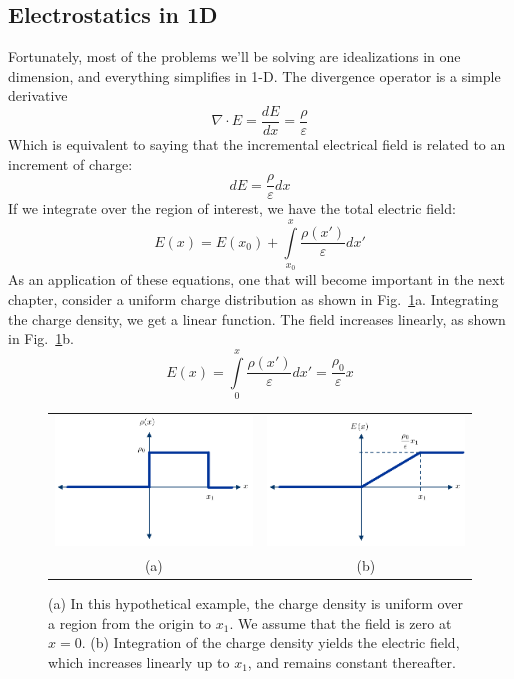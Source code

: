 \subsection{Electrostatics in 1D}
Fortunately, most of the problems we'll be solving are idealizations in one dimension, and everything simplifies in 1-D.  The divergence operator is a simple derivative
\begin{equation} 
	\nabla  \cdot E = \frac{{dE}}{{dx}} = \frac{\rho }{\varepsilon } 
\end{equation}
Which is equivalent to saying that the incremental electrical field is related to an increment of charge:
\begin{equation} 
	dE = \frac{\rho }{\varepsilon }dx 
\end{equation}
If we integrate over the region of interest, we have the total electric field:
\begin{equation} 
	E(x) = E({x_0}) + \int\limits_{{x_0}}^x {\frac{{\rho (x')}}{\varepsilon }} dx'
\end{equation}
As an application of these equations, one that will become important in the next chapter, consider a uniform charge distribution as shown in Fig.~\ref{fig:mod2-2_ICtech_sld_13}a.  Integrating the charge density, we get a linear function.  The field increases linearly, as shown in Fig.~\ref{fig:mod2-2_ICtech_sld_13}b.
\begin{equation} 
E(x) = \int\limits_0^x {\frac{{\rho (x')}}{\varepsilon }} dx' = \frac{{{\rho _0}}}{\varepsilon }x 
\end{equation}
\begin{figure}[tb]
\begin{center}
\begin{tabular}{cc}
\includegraphics[width=.4\columnwidth]{mod2-2_ICtech_sld_13} &
\includegraphics[width=.4\columnwidth]{mod2-2_ICtech_sld_13b} \\
(a) & (b) \\
\end{tabular}
\end{center}
\caption{(a) In this hypothetical example, the charge density is uniform over a region from the origin to $x_1$.  We assume that the field is zero at $x=0$.  (b) Integration of the charge density yields the electric field, which increases linearly up to $x_1$, and remains constant thereafter. } \label{fig:mod2-2_ICtech_sld_13}
\end{figure}
